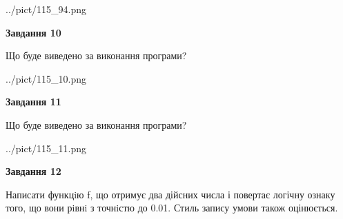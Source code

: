 \documentclass[12pt, ukrainian]{article}
\begin{document}
{\begin {large}
\begin{center}
	{../pict/115_94.png}
\end{center}
\newpage

{\begin {center}\textbf{Завдання 10}\end {center}}

Що буде виведено за виконання програми?\par
\begin{center}
	{../pict/115_10.png}
\end{center}
\newpage

{\begin {center}\textbf{Завдання 11}\end {center}}

Що буде виведено за виконання програми?\par
\begin{center}
	{../pict/115_11.png}
\end{center}
\newpage

{\begin {center}\textbf{Завдання 12}\end {center}}


Написати функцiю f, що отримує два дійсних числа і повертає логічну ознаку того, що вони рiвнi з точнiстю до 0.01. Стиль запису умови також оцінюється.\par
\newpage

\end {large}}
\end{document}
